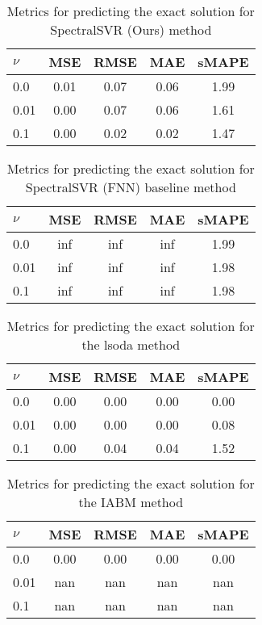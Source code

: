 \begin{table}[H]
  \caption{Metrics for predicting the exact solution for SpectralSVR (Ours) method}\label{table:comparison_exact_metrics_lssvr}
  \centering
  \begin{tabular}{lcccc}
    \toprule
    \(\nu \) & MSE  & RMSE & MAE  & sMAPE \\
    \midrule
    0.0      & 0.01 & 0.07 & 0.06 & 1.99  \\
    0.01     & 0.00 & 0.07 & 0.06 & 1.61  \\
    0.1      & 0.00 & 0.02 & 0.02 & 1.47  \\
    \bottomrule
  \end{tabular}
\end{table}
\begin{table}[H]
  \caption{Metrics for predicting the exact solution for SpectralSVR (FNN) baseline method}\label{table:comparison_exact_metrics_fnn}
  \centering
  \begin{tabular}{lcccc}
    \toprule
    \(\nu \) & MSE & RMSE & MAE & sMAPE \\
    \midrule
    0.0      & inf & inf  & inf & 1.99  \\
    0.01     & inf & inf  & inf & 1.98  \\
    0.1      & inf & inf  & inf & 1.98  \\
    \bottomrule
  \end{tabular}
\end{table}
\begin{table}[H]
  \caption{Metrics for predicting the exact solution for the lsoda method}\label{table:comparison_exact_metrics_lsoda}
  \centering
  \begin{tabular}{lcccc}
    \toprule
    \(\nu \) & MSE  & RMSE & MAE  & sMAPE \\
    \midrule
    0.0      & 0.00 & 0.00 & 0.00 & 0.00  \\
    0.01     & 0.00 & 0.00 & 0.00 & 0.08  \\
    0.1      & 0.00 & 0.04 & 0.04 & 1.52  \\
    \bottomrule
  \end{tabular}
\end{table}
\begin{table}[H]
  \caption{Metrics for predicting the exact solution for the IABM method}\label{table:comparison_exact_metrics_iabm}
  \centering
  \begin{tabular}{lcccc}
    \toprule
    \(\nu \) & MSE  & RMSE & MAE  & sMAPE \\
    \midrule
    0.0      & 0.00 & 0.00 & 0.00 & 0.00  \\
    0.01     & nan  & nan  & nan  & nan   \\
    0.1      & nan  & nan  & nan  & nan   \\
    \bottomrule
  \end{tabular}
\end{table}